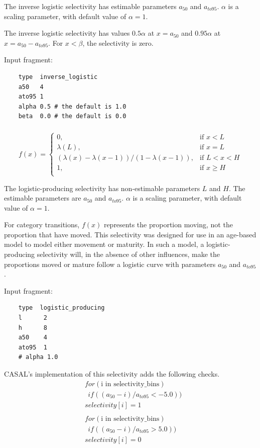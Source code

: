 The inverse logistic selectivity has estimable parameters $a_{50}$ and $a_{to95}$. $\alpha$ is a scaling parameter, with default value of $\alpha = 1$. 

The inverse logistic selectivity has values $0.5 \alpha$ at $x=a_{50}$ and $0.95 \alpha$ at $x=a_{50}-a_{to95}$. For $x < \beta$, the selectivity is zero.


Input fragment: {\small{\begin{verbatim}
	type  inverse_logistic
	a50   4
	ato95 1
	alpha 0.5 # the default is 1.0
	beta  0.0 # the default is 0.0
	\end{verbatim}}}

\subsubsection[Logistic producing]{}  \label{sec:Selectivity-LogisticProducing}

\begin{equation}
f(x)=\begin{cases}
	  0, & \text{if $x < L$} \\
	  \lambda(L), & \text{if $x=L$} \\
	  \left( \lambda(x)-\lambda(x-1) \right) / \left( 1-\lambda(x-1) \right), & \text{if $L < x < H$} \\
	  1, & \text{if $x \ge H$} \\
  \end{cases}
\end{equation}

The logistic-producing selectivity has non-estimable parameters $L$ and $H$. The estimable parameters are $a_{50}$ and $a_{to95}$. $\alpha$ is a scaling parameter, with default value of $\alpha = 1$.

For category transitions, $f(x)$ represents the proportion moving, not the proportion that have moved. This selectivity was designed for use in an age-based model to model either movement or maturity. In such a model, a logistic-producing  selectivity will, in the absence of other influences, make the proportions moved or mature follow a logistic curve with parameters $a_{50}$ and $a_{to95}$.

Input fragment: 
{\small{\begin{verbatim}
	type  logistic_producing
	l      2
	h      8
	a50    4
	ato95  1
	# alpha 1.0
\end{verbatim}}}

CASAL's implementation of this selectivity adds the following checks.
\begin{align*}
	&for(\text{i in selectivity\_bins}) \\
	& \ \ if((a_{50} - i)/a_{to95} < -5.0))\\
	&selectivity[i] = 1 \\ \\ 
&for(\text{i in selectivity\_bins}) \\
& \ \ if((a_{50} - i)/a_{to95} > 5.0))\\
&selectivity[i] = 0
\end{align*}

